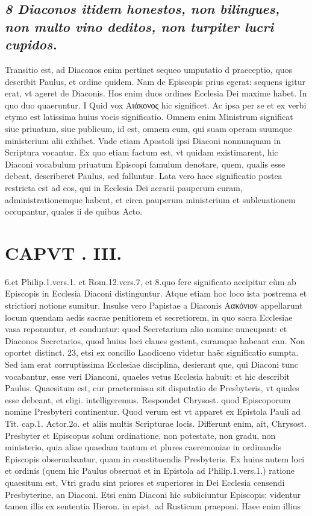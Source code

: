 \documentclass{article}
\begin{document}
\begin{pages}
\subsection*{\textit{8 Diaconos itidem honestos, non bilingues, non multo vino deditos, non turpiter lucri cupidos. }}\pstart Transitio est, ad Diaconos enim pertinet sequeo umputatio d praeceptio, quos describit Paulus, et ordine quidem. Nam de Episcopis prius egerat: sequens igitur erat, vt ageret de Diaconis. Hos enim duos ordines Ecclesia Dei maxime habet.  \pend\pstart In quo duo quaeruntur. I Quid vox Αιάκονος hic significet. Ac ipsa per se et ex verbi etymo est latissima huius vocis significatio. Omnem enim Ministrum significat siue priuatum, siue publicum, id est, omnem eum, qui suam operam suumque ministerium alii exhibet. Vnde etiam Apostoli ipsi Diaconi nonnunquam in Scriptura vocantur. Ex quo etiam factum est, vt quidam existimarent, hic Diaconi vocabulum priuatum Episcopi famulum denotare, quem, qualis esse debeat, describeret Paulus, sed falluntur. Lata vero haec significatio postea restricta est ad eos, qui in Ecclesia Dei aerarii pauperum curam, administrationemque  habent, et circa pauperum ministerium et subleuationem occupantur, quales ii de quibus Acto.  \pend
\section*{CAPVT . III. }
\marginpar{[ p.157 ]}\pstart 6.et Philip.1.vers.1. et Rom.12.vers.7, et 8.quo fere significato accipitur cùm ab Episcopis in Ecclesia Diaconi distinguntur. Atque etiam hoc loco ista postrema et strictiori notione sumitur. Insulse vero Papistae a Diaconis Αακόνιον appellarunt locum quendam aedis sacrae penitiorem et secretiorem, in quo sacra Ecclesiae vasa reponuntur, et conduntur: quod Secretarium alio nomine nuncupant: et Diaconos Secretarios, quod huius loci claues gestent, curamque habeant can. Non oportet distinct. 23, etsi ex concilio Laodiceno videtur haẽc significatio sumpta. Sed iam erat corruptissima Ecclesiae disciplina, desierant que, qui Diaconi tunc vocabantur, esse veri Dianconi, quaeles vetus Ecclesia habuit: et hic describit Paulus.  \pend{} Quaesitum est, cur praetermissa sit disputatio de Presbyteris, vt quales esse debeant, et eligi. intelligeremus. Respondet Chrysost. quod Episcoporum nomine Presbyteri continentur. Quod verum est vt apparet ex Epistola Pauli ad Tit. cap.1. Actor.2o. et aliis multis Scripturae locis. Differunt enim, ait, Chrysost. Presbyter et Episcopus solum ordinatione, non potestate, non gradu, non ministerio, quia aliae quaedam tantum et plures caeremoniae in ordinandis Episcopis obseruabantur, quam in constituendis Presbyteris.  \pend\pstart Ex huius autem loci et ordinis (quem hic Paulus obseruat et in Epistola ad Philip.1.vers.1.) ratione quaesitum est, Vtri gradu sint priores et superiores in Dei Ecclesia censendi Presbyterine, an Diaconi. Etsi enim Diaconi hic subiiciuntur Episcopis: videntur tamen illis ex sententia Hieron. in epist. ad Rusticum praeponi. Haee enim illius  \pend

\end{pages}
\end{document}
